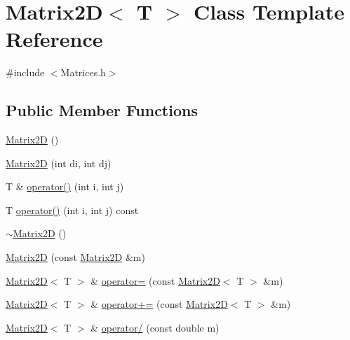 \hypertarget{classMatrix2D}{}\section{Matrix2D$<$ T $>$ Class Template Reference}
\label{classMatrix2D}


{\ttfamily \#include $<$Matrices.\+h$>$}

\subsection*{Public Member Functions}
\begin{DoxyCompactItemize}
\item 
\mbox{\hyperlink{classMatrix2D_a950bb2aa76c86e057d91f430d5a27b57_a950bb2aa76c86e057d91f430d5a27b57}{Matrix2D}} ()
\item 
\mbox{\hyperlink{classMatrix2D_ac93acc71341e612cf8b23d4308c561f8_ac93acc71341e612cf8b23d4308c561f8}{Matrix2D}} (int di, int dj)
\item 
T \& \mbox{\hyperlink{classMatrix2D_abcb61863666c4e17352c9fd2fc0a254a_abcb61863666c4e17352c9fd2fc0a254a}{operator()}} (int i, int j)
\item 
T \mbox{\hyperlink{classMatrix2D_a1a14d98d090d0d1cbda97a8fa797f1c5_a1a14d98d090d0d1cbda97a8fa797f1c5}{operator()}} (int i, int j) const
\item 
\mbox{\hyperlink{classMatrix2D_a6b86d001220161af2136ba49fd8b26b9_a6b86d001220161af2136ba49fd8b26b9}{$\sim$\+Matrix2D}} ()
\item 
\mbox{\hyperlink{classMatrix2D_aa1d3642d7cea07adac1a7bd83586d292_aa1d3642d7cea07adac1a7bd83586d292}{Matrix2D}} (const \mbox{\hyperlink{classMatrix2D}{Matrix2D}} \&m)
\item 
\mbox{\hyperlink{classMatrix2D}{Matrix2D}}$<$ T $>$ \& \mbox{\hyperlink{classMatrix2D_a17597829237784fa6089a23b7accb631_a17597829237784fa6089a23b7accb631}{operator=}} (const \mbox{\hyperlink{classMatrix2D}{Matrix2D}}$<$ T $>$ \&m)
\item 
\mbox{\hyperlink{classMatrix2D}{Matrix2D}}$<$ T $>$ \& \mbox{\hyperlink{classMatrix2D_a05b92232d9a5e7b76c4d4c1508ae2e12_a05b92232d9a5e7b76c4d4c1508ae2e12}{operator+=}} (const \mbox{\hyperlink{classMatrix2D}{Matrix2D}}$<$ T $>$ \&m)
\item 
\mbox{\hyperlink{classMatrix2D}{Matrix2D}}$<$ T $>$ \& \mbox{\hyperlink{classMatrix2D_a48122f2fa79bf511d0c4e143dcdb0cf0_a48122f2fa79bf511d0c4e143dcdb0cf0}{operator/}} (const double m)
\item 

\end{DoxyCompactItemize}
